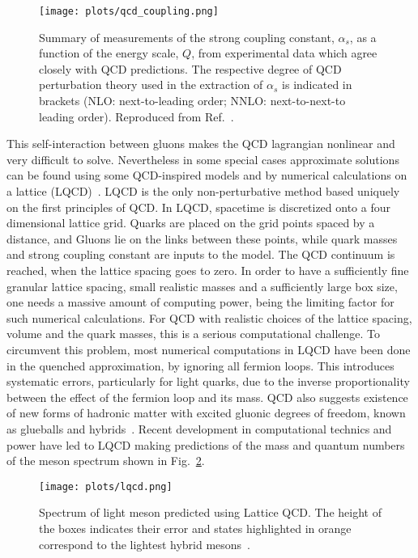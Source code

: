 \begin{figure}[!t]
    \centering
        \texttt{[image: plots/qcd\_coupling.png]}
        \caption{Summary of measurements of the strong coupling constant, $\alpha_{s}$, as a function of the energy scale, $Q$, from experimental data which agree closely with QCD predictions. The respective degree of QCD perturbation theory used in the extraction of $\alpha_{s}$ is indicated in brackets (NLO: next-to-leading order; NNLO: next-to-next-to leading order). Reproduced from Ref.~\cite{Tanabashi18}.}
        \label{fig.1.1.2}
\end{figure}

This self-interaction between gluons makes the QCD lagrangian nonlinear and very difficult to solve. Nevertheless in some special cases approximate solutions can be found using some QCD-inspired models and by numerical calculations on a lattice (LQCD)~\cite{Dudek13}. LQCD is the only non-perturbative method based uniquely on the first principles of QCD. In LQCD, spacetime is discretized onto a four dimensional lattice grid. Quarks are placed on the grid points spaced by a distance, and Gluons lie on the links between these points, while quark masses and strong coupling constant are inputs to the model. The QCD continuum is reached, when the lattice spacing goes to zero. In order to have a sufficiently fine granular lattice spacing, small realistic masses and a sufficiently large box size, one needs a massive amount of computing power, being the limiting factor for such numerical calculations. For QCD with realistic choices of the lattice spacing, volume and the quark masses, this is a serious computational challenge. To circumvent this problem, most numerical computations in LQCD have been done in the quenched approximation, by ignoring all fermion loops. This introduces systematic errors, particularly for light quarks, due to the inverse proportionality between the effect of the fermion loop and its mass. QCD also suggests existence of new forms of hadronic matter with excited gluonic degrees of freedom, known as glueballs and hybrids~\cite{Tanabashi18}. Recent development in computational technics and power have led to LQCD making predictions of the mass and quantum numbers of the meson spectrum shown in Fig.~\ref{fig.1.1.3}.

\begin{landscape}
    \vspace*{\fill}
    \begin{figure}[H]
        \centering
        \texttt{[image: plots/lqcd.png]}
        \caption{Spectrum of light meson predicted using Lattice QCD. The height of the boxes indicates their error and states highlighted in orange correspond to the lightest hybrid mesons~\cite{Dudek13}.}
        \label{fig.1.1.3}
    \end{figure}
    \vspace*{\fill}
\end{landscape}

